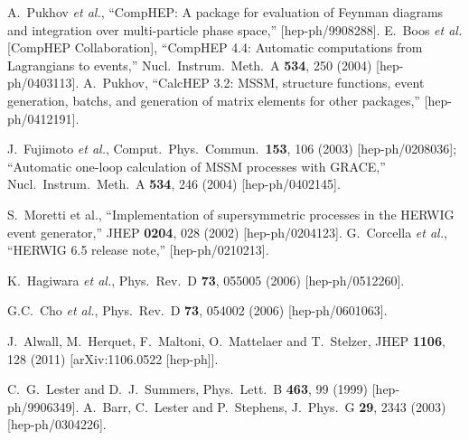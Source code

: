 \documentclass[12pt]{article}
\begin{document}
\begin{thebibliography}{999}
A.~Pukhov {\it et al.},
  ``CompHEP: A package for evaluation of Feynman diagrams and integration  over
  multi-particle phase space,''
  [hep-ph/9908288].
E.~Boos {\it et al.}  [CompHEP Collaboration],
  ``CompHEP 4.4: Automatic computations from Lagrangians to events,''
  Nucl.\ Instrum.\ Meth.\ A {\bf 534}, 250 (2004)
  [hep-ph/0403113].
A.~Pukhov,
  ``CalcHEP 3.2: MSSM, structure functions, event generation, batchs, and
  generation of matrix elements for other packages,''
  [hep-ph/0412191].

J.~Fujimoto {\em et al.}, 
  Comput.\ Phys.\ Commun.\  {\bf 153}, 106 (2003)
  [hep-ph/0208036];
  ``Automatic one-loop calculation of MSSM processes with GRACE,''
  Nucl.\ Instrum.\ Meth.\ A {\bf 534}, 246 (2004)
  [hep-ph/0402145].

S.~Moretti et al.,
  ``Implementation of supersymmetric processes in the HERWIG event
  generator,''
  JHEP {\bf 0204}, 028 (2002)
  [hep-ph/0204123].
G.~Corcella {\it et al.},
  ``HERWIG 6.5 release note,''
  [hep-ph/0210213].

K.~Hagiwara {\it et al.},
  Phys.\ Rev.\ D {\bf 73}, 055005 (2006)
  [hep-ph/0512260].

G.C.~Cho {\it et al.},
  Phys.\ Rev.\ D {\bf 73}, 054002 (2006)
  [hep-ph/0601063].

  J.~Alwall, M.~Herquet, F.~Maltoni, O.~Mattelaer and T.~Stelzer,
  JHEP {\bf 1106}, 128 (2011)
  [arXiv:1106.0522 [hep-ph]].

C.~G.~Lester and D.~J.~Summers,
  Phys.\ Lett.\ B {\bf 463}, 99 (1999)
  [hep-ph/9906349].
A.~Barr, C.~Lester and P.~Stephens,
  J.\ Phys.\ G {\bf 29}, 2343 (2003)
  [hep-ph/0304226].


\end{thebibliography}
\end{document}
